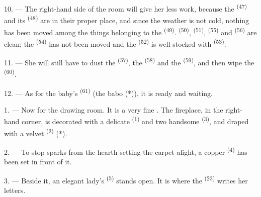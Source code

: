 10. --- The right-hand side of the room will give her less work, because the
 \textsuperscript{(47)} and its  \textsuperscript{(48)} are
in their proper place, and since the weather is not cold, nothing has been moved among the
things belonging to the  \textsuperscript{(49)}. 
\textsuperscript{(50)},  \textsuperscript{(51)}, 
\textsuperscript{(55)} and  \textsuperscript{(56)} are clean; the
 \textsuperscript{(54)} has not been moved and the 
\textsuperscript{(52)} is well stocked with
 \textsuperscript{(53)}.



11. --- She will still have to dust the  \textsuperscript{(57)}, the
 \textsuperscript{(58)} and the 
\textsuperscript{(59)}, and then wipe the  \textsuperscript{(60)}.

12. --- As for the baby's  \textsuperscript{(61)} (the babo (*)), it is ready
and waiting.

\VUsaut{5.0mm}
\VUsaut{3.0mm}

1. --- Now for the drawing room. It is a very fine . The fireplace, in the
right-hand corner, is decorated with a delicate
 \textsuperscript{(1)} and two handsome 
\textsuperscript{(3)}, and draped with a velvet  \textsuperscript{(2)} (*).

2. --- To stop sparks from the hearth setting the carpet alight, a copper 
\textsuperscript{(4)} has been set in front of it.

3. --- Beside it, an elegant lady's  \textsuperscript{(5)} stands open.
It is where the  \textsuperscript{(23)} writes her letters.

